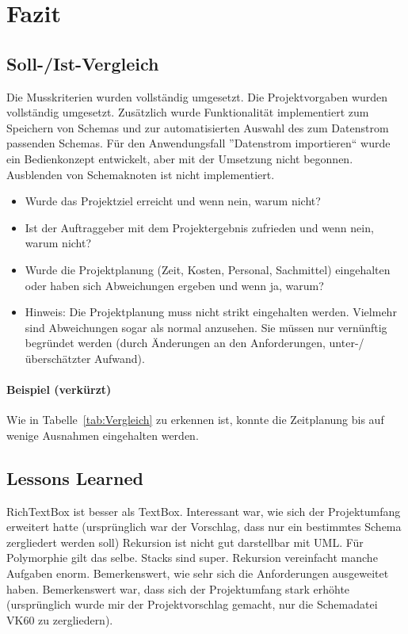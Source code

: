 \section{Fazit} 
\label{sec:Fazit}

\subsection{Soll-/Ist-Vergleich}
\label{sec:SollIstVergleich}
Die Musskriterien wurden vollständig umgesetzt. Die Projektvorgaben wurden vollständig umgesetzt.
Zusätzlich wurde Funktionalität implementiert zum Speichern von Schemas und zur automatisierten Auswahl des zum Datenstrom passenden Schemas.
Für den Anwendungsfall ''Datenstrom importieren`` wurde ein Bedienkonzept entwickelt, aber mit der Umsetzung nicht begonnen. 
Ausblenden von Schemaknoten ist nicht implementiert.


\begin{itemize}
	\item Wurde das Projektziel erreicht und wenn nein, warum nicht?
	\item Ist der Auftraggeber mit dem Projektergebnis zufrieden und wenn nein, warum nicht?
	\item Wurde die Projektplanung (Zeit, Kosten, Personal, Sachmittel) eingehalten oder haben sich Abweichungen ergeben und wenn ja, warum?
	\item Hinweis: Die Projektplanung muss nicht strikt eingehalten werden. Vielmehr sind Abweichungen sogar als normal anzusehen. Sie müssen nur vernünftig begründet werden (\zB durch Änderungen an den Anforderungen, unter-/überschätzter Aufwand).
\end{itemize}

\paragraph{Beispiel (verkürzt)}
Wie in Tabelle~\ref{tab:Vergleich} zu erkennen ist, konnte die Zeitplanung bis auf wenige Ausnahmen eingehalten werden.


\subsection{Lessons Learned}
\label{sec:LessonsLearned}
RichTextBox ist besser als TextBox.
Interessant war, wie sich der Projektumfang erweitert hatte (ursprünglich war der Vorschlag, dass nur ein bestimmtes Schema zergliedert werden soll)
Rekursion ist nicht gut darstellbar mit UML. Für Polymorphie gilt das selbe. Stacks sind super. Rekursion vereinfacht manche Aufgaben enorm. Bemerkenswert, wie sehr sich die Anforderungen ausgeweitet haben.
Bemerkenswert war, dass sich der Projektumfang stark erhöhte (ursprünglich wurde mir der Projektvorschlag gemacht, nur die Schemadatei VK60 zu zergliedern).



